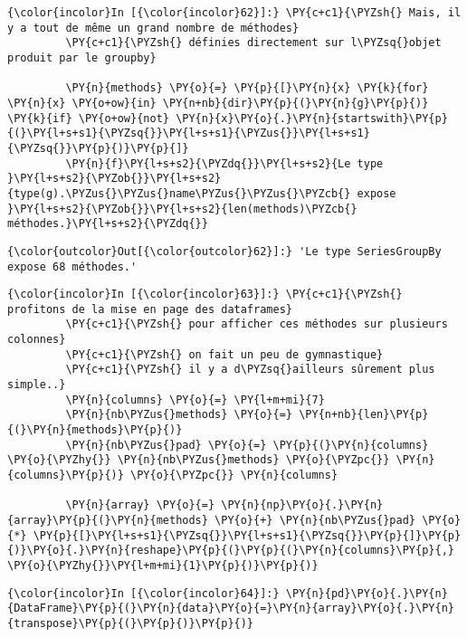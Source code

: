     \begin{Verbatim}[commandchars=\\\{\}]
{\color{incolor}In [{\color{incolor}62}]:} \PY{c+c1}{\PYZsh{} Mais, il y a tout de même un grand nombre de méthodes}
         \PY{c+c1}{\PYZsh{} définies directement sur l\PYZsq{}objet produit par le groupby}
         
         \PY{n}{methods} \PY{o}{=} \PY{p}{[}\PY{n}{x} \PY{k}{for} \PY{n}{x} \PY{o+ow}{in} \PY{n+nb}{dir}\PY{p}{(}\PY{n}{g}\PY{p}{)} \PY{k}{if} \PY{o+ow}{not} \PY{n}{x}\PY{o}{.}\PY{n}{startswith}\PY{p}{(}\PY{l+s+s1}{\PYZsq{}}\PY{l+s+s1}{\PYZus{}}\PY{l+s+s1}{\PYZsq{}}\PY{p}{)}\PY{p}{]}
         \PY{n}{f}\PY{l+s+s2}{\PYZdq{}}\PY{l+s+s2}{Le type }\PY{l+s+s2}{\PYZob{}}\PY{l+s+s2}{type(g).\PYZus{}\PYZus{}name\PYZus{}\PYZus{}\PYZcb{} expose }\PY{l+s+s2}{\PYZob{}}\PY{l+s+s2}{len(methods)\PYZcb{} méthodes.}\PY{l+s+s2}{\PYZdq{}}
\end{Verbatim}


\begin{Verbatim}[commandchars=\\\{\}]
{\color{outcolor}Out[{\color{outcolor}62}]:} 'Le type SeriesGroupBy expose 68 méthodes.'
\end{Verbatim}
            
    \begin{Verbatim}[commandchars=\\\{\}]
{\color{incolor}In [{\color{incolor}63}]:} \PY{c+c1}{\PYZsh{} profitons de la mise en page des dataframes}
         \PY{c+c1}{\PYZsh{} pour afficher ces méthodes sur plusieurs colonnes}
         \PY{c+c1}{\PYZsh{} on fait un peu de gymnastique}
         \PY{c+c1}{\PYZsh{} il y a d\PYZsq{}ailleurs sûrement plus simple..}
         \PY{n}{columns} \PY{o}{=} \PY{l+m+mi}{7}
         \PY{n}{nb\PYZus{}methods} \PY{o}{=} \PY{n+nb}{len}\PY{p}{(}\PY{n}{methods}\PY{p}{)}
         \PY{n}{nb\PYZus{}pad} \PY{o}{=} \PY{p}{(}\PY{n}{columns} \PY{o}{\PYZhy{}} \PY{n}{nb\PYZus{}methods} \PY{o}{\PYZpc{}} \PY{n}{columns}\PY{p}{)} \PY{o}{\PYZpc{}} \PY{n}{columns}
         
         \PY{n}{array} \PY{o}{=} \PY{n}{np}\PY{o}{.}\PY{n}{array}\PY{p}{(}\PY{n}{methods} \PY{o}{+} \PY{n}{nb\PYZus{}pad} \PY{o}{*} \PY{p}{[}\PY{l+s+s1}{\PYZsq{}}\PY{l+s+s1}{\PYZsq{}}\PY{p}{]}\PY{p}{)}\PY{o}{.}\PY{n}{reshape}\PY{p}{(}\PY{p}{(}\PY{n}{columns}\PY{p}{,} \PY{o}{\PYZhy{}}\PY{l+m+mi}{1}\PY{p}{)}\PY{p}{)}
\end{Verbatim}


    \begin{Verbatim}[commandchars=\\\{\}]
{\color{incolor}In [{\color{incolor}64}]:} \PY{n}{pd}\PY{o}{.}\PY{n}{DataFrame}\PY{p}{(}\PY{n}{data}\PY{o}{=}\PY{n}{array}\PY{o}{.}\PY{n}{transpose}\PY{p}{(}\PY{p}{)}\PY{p}{)}
\end{Verbatim}


